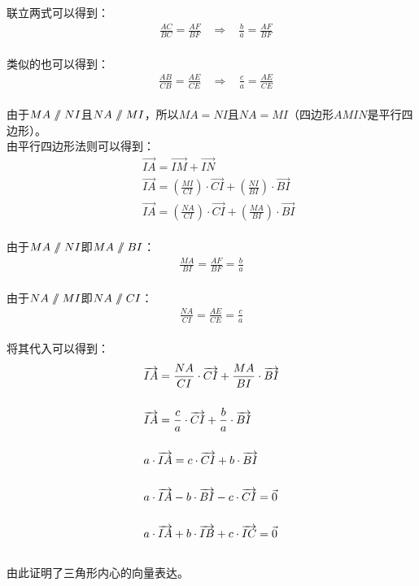 \documentclass[UTF8]{ctexart}
\let\nvec\vec
\def\vec#1{\nvec{\vphantom b\smash{#1}}}
\renewcommand\parallel{{\hspace{3.0pt}\mathrel{/\mskip-6.5mu/}\hspace{2.6pt}}}
\begin{document}
\newpage

    联立两式可以得到：
    \begin{align}
        &\frac{AC}{BC}=\frac{AF}{BF}~~~~\Longrightarrow~~~~\frac{b}{a}=\frac{AF}{BF}
    \end{align}\\
    类似的也可以得到：
    \begin{align}
        &\frac{AB}{CB}=\frac{AE}{CE}~~~~\Longrightarrow~~~~\frac{c}{a}=\frac{AE}{CE}
    \end{align}\\
    由于$MA\parallel NI$且$NA\parallel MI$，所以$MA=NI$且$NA=MI$（四边形$AMIN$是平行四边形）。\\[3mm]
    由平行四边形法则可以得到：
    \begin{align}
        &~~\overrightarrow{IA}=\overrightarrow{IM}+\overrightarrow{IN}\\[5mm]
        &~~\overrightarrow{IA}=\left(\frac{MI}{CI}\right)\cdot\overrightarrow{CI}+\left(\frac{NI}{BI}\right)\cdot\overrightarrow{BI}\\[5mm]
        &~~\overrightarrow{IA}=\left(\frac{NA}{CI}\right)\cdot\overrightarrow{CI}+\left(\frac{MA}{BI}\right)\cdot\overrightarrow{BI}
    \end{align}\\
    由于$MA\parallel NI$即$MA\parallel BI$：
    \begin{align}
        \frac{MA}{BI}=\frac{AF}{BF}=\frac{b}{a}
    \end{align}\\
    由于$NA\parallel MI$即$NA\parallel CI$：
    \begin{align}
        \frac{NA}{CI}=\frac{AE}{CE}=\frac{c}{a}
    \end{align}\\
    将其代入可以得到：
    \begin{align}
        &\overrightarrow{IA}=\frac{NA}{CI}\cdot\overrightarrow{CI}+\frac{MA}{BI}\cdot\overrightarrow{BI}\\[5mm]
        &\overrightarrow{IA}=\frac{c}{a}\cdot\overrightarrow{CI}+\frac{b}{a}\cdot\overrightarrow{BI}\\[5mm]
        &a\cdot\overrightarrow{IA}=c\cdot\overrightarrow{CI}+b\cdot\overrightarrow{BI}\\[5mm]
        &a\cdot\overrightarrow{IA}-b\cdot\overrightarrow{BI}-c\cdot\overrightarrow{CI}=\vec{0}\\[5mm]
        &a\cdot\overrightarrow{IA}+b\cdot\overrightarrow{IB}+c\cdot\overrightarrow{IC}=\vec{0}
    \end{align}\\
    由此证明了三角形内心的向量表达。
\end{document}
